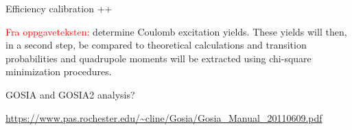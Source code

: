 \documentclass[twoside,english]{uiofysmaster/uiofysmaster}
\begin{document}
\bigskip

Efficiency calibration ++

\bigskip

\textcolor{red}{Fra oppgaveteksten:} \newline
determine Coulomb excitation yields. These yields will then, in a second step, be compared to theoretical calculations and transition probabilities and quadrupole moments will be extracted using chi-square minimization procedures.


GOSIA and GOSIA2 analysis?

\url{https://www.pas.rochester.edu/~cline/Gosia/Gosia_Manual_20110609.pdf}





\end{document}
